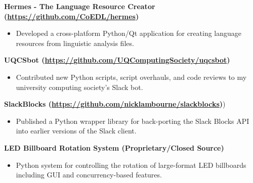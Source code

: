 \documentclass[a4paper]{article}
\newenvironment{singleitem}
{   \small
    \vspace{0pt}
    \begin{itemize}
    \setlength{\itemsep}{0pt}
    \setlength{\parskip}{0pt}
    \setlength{\parsep}{0pt}   }
{\end{itemize} \vspace{1pt}	}
\begin{document}
\textbf{{Hermes - The Language Resource Creator} (\href{https://github.com/CoEDL/hermes}{https://github.com/CoEDL/hermes})}
\begin{singleitem}
	\item Developed a cross-platform Python/Qt application for creating language resources from linguistic analysis files.
\end{singleitem}


\textbf{UQCSbot (\href{https://github.com/UQComputingSociety/uqcsbot}{https://github.com/UQComputingSociety/uqcsbot})}
\begin{singleitem}
	\item Contributed new Python scripts, script overhauls, and code reviews to my university computing society's Slack bot.
\end{singleitem}

\textbf{SlackBlocks (\href{https://github.com/nicklambourne/slackblocks}{https://github.com/nicklambourne/slackblocks})})
\begin{singleitem}
	\item Published a Python wrapper library for back-porting the Slack Blocks API into earlier versions of the Slack client.
\end{singleitem}

\textbf{LED Billboard Rotation System (Proprietary/Closed Source)}
\begin{singleitem}
	\item Python system for controlling the rotation of large-format LED billboards including GUI and concurrency-based features.
\end{singleitem}

\vspace{1.5mm}
\end{document}
